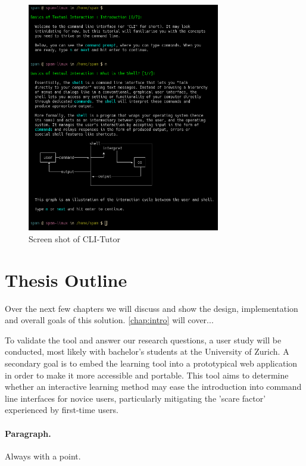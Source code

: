 \begin{figure}[htbp]
	\centering
	\includegraphics[width=0.75\textwidth]{img/clitutor}
	\caption{Screen shot of CLI-Tutor}
    \label{fig:clitutor}
\end{figure}

\section{Thesis Outline}

Over the next few chapters we will discuss and show the design, implementation
and overall goals of this solution. \autoref{chap:intro} will cover...

To validate the tool and answer our
research questions, a user study will be conducted, most likely with bachelor's
students at the University of Zurich. A secondary goal is to embed the learning
tool into a prototypical web application in order to make it more accessible
and portable.
This tool aims to determine whether an interactive learning method may ease the
introduction into command line interfaces for novice users, particularly
mitigating the 'scare factor' experienced by first-time users. 

\paragraph{Paragraph.} Always with a point. {}
